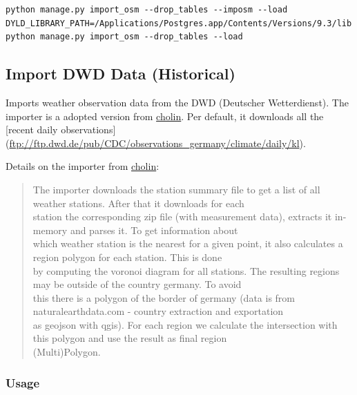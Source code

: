 \documentclass[paper=a4, fontsize=11pt]{scrartcl} %
\numberwithin{equation}{section} %
\numberwithin{figure}{section} %
\numberwithin{table}{section} %
\begin{document}
\begin{lstlisting}[breaklines=true]
python manage.py import_osm --drop_tables --imposm --load
DYLD_LIBRARY_PATH=/Applications/Postgres.app/Contents/Versions/9.3/lib python manage.py import_osm --drop_tables --load
\end{lstlisting}

\subsection{Import DWD Data (Historical)}\label{import-dwd-data}

Imports weather observation data from the DWD (Deutscher Wetterdienst).
The importer is a adopted version
from \href{https://github.com/cholin/fuberlin_spatial_db_project}{cholin}.
Per default, it downloads all the {[}recent daily
observations{]}\\(\url{ftp://ftp.dwd.de/pub/CDC/observations_germany/climate/daily/kl}).

Details on the importer from
\href{https://github.com/cholin/fuberlin_spatial_db_project/blob/master/scripts/dwd/README.md}{cholin}:

\begin{quote}
The importer downloads the station summary file to get a list of all
weather stations. After that it downloads for each\\station the
corresponding zip file (with measurement data), extracts it in-memory
and parses it. To get information about\\which weather station is the
nearest for a given point, it also calculates a region polygon for each
station. This is done\\by computing the voronoi diagram for all
stations. The resulting regions may be outside of the country germany.
To avoid\\this there is a polygon of the border of germany (data is from
naturalearthdata.com - country extraction and exportation\\as geojson
with qgis). For each region we calculate the intersection with this
polygon and use the result as final region\\(Multi)Polygon.
\end{quote}

\subsubsection*{Usage}\label{usage-1}
\end{document}
